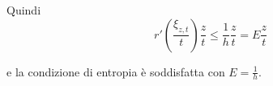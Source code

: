 \begin{dimostrazione}
\begin{itemize}
              Quindi
              \begin{equation*}
                  r'\left(\frac{\xi _{z,t}}{t}\right)\frac{z}{t} \leq \frac{1}{h}\frac{z}{t} = E \frac{z}{t}
              \end{equation*}

              e la condizione di entropia è soddisfatta con $\displaystyle E=\frac{1}{h}$.
    \end{itemize}

\end{dimostrazione}